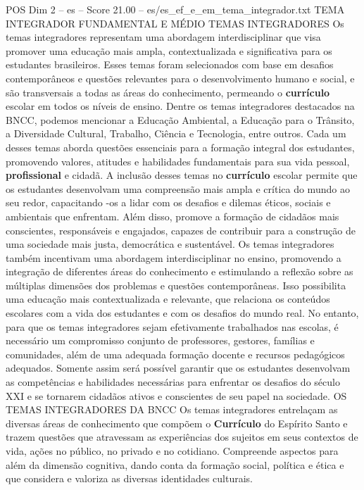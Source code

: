 \begin{textsample}{POS Dim 2 – es – Score 21.00 – es/es\_ef\_e\_em\_tema\_integrador.txt}  \label{ex:f2_pos_215}
TEMA INTEGRADOR FUNDAMENTAL E MÉDIO TEMAS INTEGRADORES Os temas integradores representam uma abordagem interdisciplinar que visa promover uma educação mais ampla, contextualizada e significativa para os estudantes brasileiros.
Esses temas foram selecionados com base em desafios contemporâneos e questões relevantes para o desenvolvimento humano e social, e são transversais a todas as áreas do conhecimento, permeando o \textbf{currículo} escolar em todos os níveis de ensino.
Dentre os temas integradores destacados na BNCC, podemos mencionar a Educação Ambiental, a Educação para o Trânsito, a Diversidade Cultural, Trabalho, Ciência e Tecnologia, entre outros.
Cada um desses temas aborda questões essenciais para a formação integral dos estudantes, promovendo valores, atitudes e habilidades fundamentais para sua vida pessoal, \textbf{profissional} e cidadã.
A inclusão desses temas no \textbf{currículo} escolar permite que os estudantes desenvolvam uma compreensão mais ampla e crítica do mundo ao seu redor, capacitando -os a lidar com os desafios e dilemas éticos, sociais e ambientais que enfrentam.
Além disso, promove a formação de cidadãos mais conscientes, responsáveis e engajados, capazes de contribuir para a construção de uma sociedade mais justa, democrática e sustentável.
Os temas integradores também incentivam uma abordagem interdisciplinar no ensino, promovendo a integração de diferentes áreas do conhecimento e estimulando a reflexão sobre as múltiplas dimensões dos problemas e questões contemporâneas.
Isso possibilita uma educação mais contextualizada e relevante, que relaciona os conteúdos escolares com a vida dos estudantes e com os desafios do mundo real.
No entanto, para que os temas integradores sejam efetivamente trabalhados nas escolas, é necessário um compromisso conjunto de professores, gestores, famílias e comunidades, além de uma adequada formação docente e recursos pedagógicos adequados.
Somente assim será possível garantir que os estudantes desenvolvam as competências e habilidades necessárias para enfrentar os desafios do século XXI e se tornarem cidadãos ativos e conscientes de seu papel na sociedade.
OS TEMAS INTEGRADORES DA BNCC Os temas integradores entrelaçam as diversas áreas de conhecimento que compõem o \textbf{Currículo} do Espírito Santo e trazem questões que atravessam as experiências dos sujeitos em seus contextos de vida, ações no público, no privado e no cotidiano.
Compreende aspectos para além da dimensão cognitiva, dando conta da formação social, política e ética e que considera e valoriza as diversas identidades culturais.

\end{textsample}
